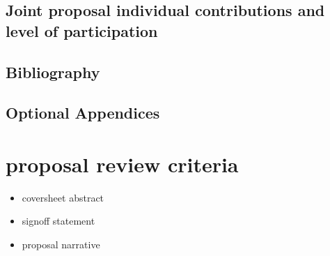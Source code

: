 \documentclass[]{article}
\begin{document}
 \subsection{Joint proposal individual contributions and level of participation}
 \subsection{Bibliography} %
 \subsection{Optional Appendices} %
 
 

\section{proposal review criteria}
\begin{itemize}
	\item coversheet abstract
	\item signoff statement %
	\item proposal narrative
\end{itemize}




\end{document}
